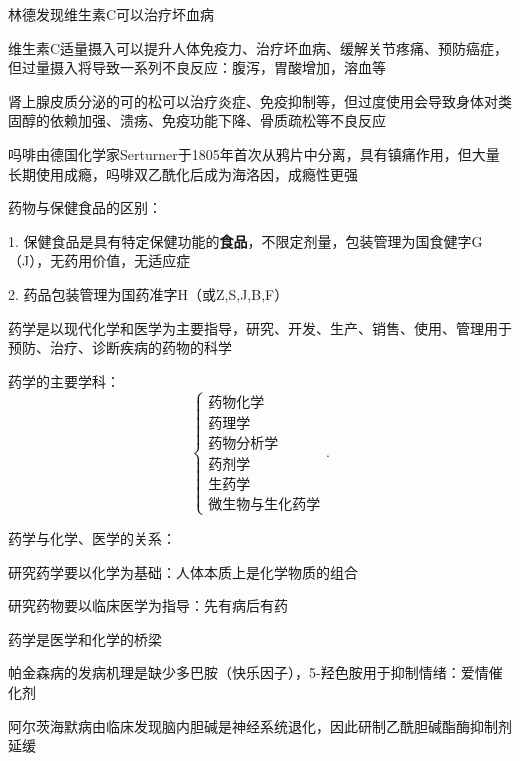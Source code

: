 林德发现维生素C可以治疗坏血病
\begin{eg}
    维生素C适量摄入可以提升人体免疫力、治疗坏血病、缓解关节疼痛、预防癌症，但过量摄入将导致一系列不良反应：腹泻，胃酸增加，溶血等
\end{eg}
\begin{eg}
    肾上腺皮质分泌的可的松可以治疗炎症、免疫抑制等，但过度使用会导致身体对类固醇的依赖加强、溃疡、免疫功能下降、骨质疏松等不良反应
\end{eg}
\begin{eg}
    吗啡由德国化学家Serturner于1805年首次从鸦片中分离，具有镇痛作用，但大量长期使用成瘾，吗啡双乙酰化后成为海洛因，成瘾性更强
\end{eg}
\begin{question}
    药物与保健食品的区别：
\end{question}
1. 保健食品是具有特定保健功能的\textbf{食品}，不限定剂量，包装管理为国食健字G（J），无药用价值，无适应症

2. 药品包装管理为国药准字H（或Z,S,J,B,F）

\begin{notation}
    药学是以现代化学和医学为主要指导，研究、开发、生产、销售、使用、管理用于预防、治疗、诊断疾病的药物的科学
\end{notation}
药学的主要学科：
\[
    \begin{cases}
        \mbox{药物化学}\\ 
        \mbox{药理学}\\ 
        \mbox{药物分析学}\\ 
        \mbox{药剂学}\\ 
        \mbox{生药学}\\ 
        \mbox{微生物与生化药学}
    \end{cases}
.\] 
\begin{question}
药学与化学、医学的关系：
\end{question}
\begin{notation}
    研究药学要以化学为基础：人体本质上是化学物质的组合

    研究药物要以临床医学为指导：先有病后有药

    药学是医学和化学的桥梁
\end{notation}
\begin{eg}
    帕金森病的发病机理是缺少多巴胺（快乐因子），5-羟色胺用于抑制情绪：爱情催化剂
\end{eg}
\begin{eg}
    阿尔茨海默病由临床发现脑内胆碱是神经系统退化，因此研制乙酰胆碱酯酶抑制剂延缓
\end{eg}
